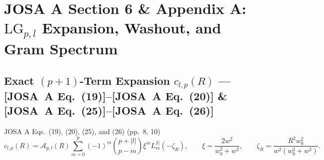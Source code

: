 \documentclass[10pt,letterpaper]{article}
\newcommand{\abs}[1]{\lvert #1 \rvert}
\newcommand{\josa}[1]{\textbf{[JOSA~A Eq.~(#1)]}}
\numberwithin{equation}{section}
\begin{document}
\section{JOSA A Section 6 \& Appendix A: $\mathrm{LG}_{p,l}$ Expansion, Washout, and Gram Spectrum}
\label{sec:v2_s6}

\subsection{Exact $(p+1)$-Term Expansion $c_{l,p}(R)$ --- \josa{19}--\josa{20} \& \josa{25}--\josa{26}}

\begin{targeteq}{JOSA A Eqs.~(19), (20), (25), and (26) (pp.~8, 10)}
\[
  c_{l,p}(R) = \mathcal{A}_{p,l}(R)\sum_{m=0}^p (-1)^m\binom{p+\abs{l}}{p-m}\xi^m L_m^{\abs{l}}(-\zeta_R), \qquad
  \xi = \frac{2w^2}{w_0^2+w^2}, \qquad \zeta_R = \frac{R^2 w_0^2}{w^2(w_0^2+w^2)}.
\]
\end{targeteq}
\end{document}
